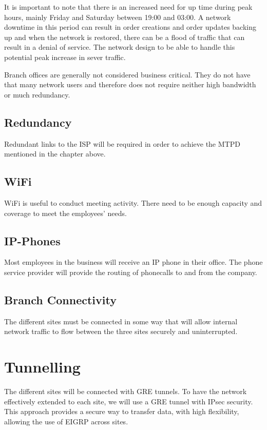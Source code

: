 It is important to note that there is an increased need for up time during peak hours, mainly Friday and Saturday between 19:00 and 03:00.
A network downtime in this period can result in order creations and order updates backing up and when the network is restored, there can be a flood of traffic that can result in a denial of service.
The network design to be able to handle this potential peak increase in sever traffic.

Branch offices are generally not considered business critical.
They do not have that many network users and therefore does not require neither high bandwidth or much redundancy.


\subsection{Redundancy}
Redundant links to the ISP will be required in order to achieve the MTPD mentioned in the chapter above.

\subsection{WiFi}
WiFi is useful to conduct meeting activity.
There need to be enough capacity and coverage to meet the employees' needs.

\subsection{IP-Phones}
Most employees in the business will receive an IP phone in their office.
The phone service provider will provide the routing of phonecalls to and from the company.


\subsection{Branch Connectivity}
The different sites must be connected in some way that will allow internal network traffic to flow between the three sites securely and uninterrupted.


\section{Tunnelling}
The different sites will be connected with GRE tunnels.
To have the network effectively extended to each site, we will use a GRE tunnel with IPsec security.
This approach provides a secure way to transfer data, with high flexibility, allowing the use of EIGRP across sites.

